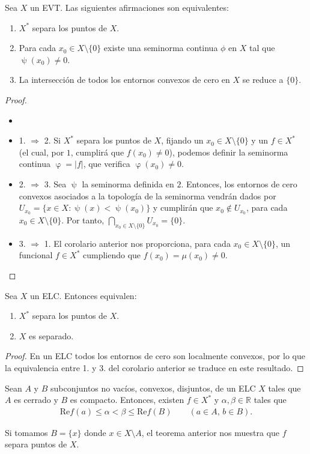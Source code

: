 \begin{corolario}
Sea $X$ un EVT. Las siguientes afirmaciones son equivalentes:
\begin{enumerate}
\item $X^{*}$ separa los puntos de $X$.
\item Para cada $x_{0}\in X\setminus \{0\}$ existe una seminorma continua $\phi$ en $X$ tal que $\uppsi(x_{0})\neq 0$.
\item La intersección de todos los entornos convexos de cero en $X$ se reduce a $\{0\}$.
\end{enumerate}
\end{corolario}
\begin{proof}
\begin{itemize}
\item[]
\item 1. $\Rightarrow$ 2. Si $X^{*}$ separa los puntos de $X$, fijando un $x_{0}\in X\setminus \{0\}$ y un $f\in X^{*}$ (el cual, por $1$, cumplirá que  $f(x_{0}) \neq 0$), podemos definir la seminorma continua $\upvarphi = |f|$, que verifica $\upvarphi (x_{0}) \neq 0$.


\item 2. $ \Rightarrow$ 3.  Sea $\uppsi$ la seminorma definida en $2$. Entonces, los entornos de cero convexos asociados a la topología de la seminorma vendrán dados por $U_{x_{0}} = \{x\in X : \uppsi(x) < \uppsi (x_{0}) \}$ y cumplirán que $x_{0}\notin U_{x_{0}}$, para cada $x_{0}\in X\setminus \{0\}$. Por tanto, $\bigcap_{x_{0}\in X\setminus \{0\}} U_{x_{0}} = \{0\}$.


\item 3. $ \Rightarrow$ 1. El corolario anterior nos proporciona, para cada $x_{0}\in X\setminus \{0\}$, un funcional $f\in X^{*}$ cumpliendo que $f(x_{0}) = \mu (x_{0}) \neq 0$. 
\end{itemize}
\end{proof}
\begin{corolario}
Sea $X$ un ELC. Entonces equivalen:
\begin{enumerate}
\item $X^{*}$ separa los puntos de $X$.
\item $X$ es separado. 
\end{enumerate}
\end{corolario}
\begin{proof}
En un ELC todos los entornos de cero son localmente convexos, por lo que la equivalencia entre 1. y 3. del corolario anterior se traduce en este resultado. 
\end{proof}
\begin{teorema}
Sean $A$ y $B$ subconjuntos no vacíos, convexos, disjuntos, de un ELC $X$ tales que $A$ es cerrado y $B$ es compacto. Entonces, existen $f\in X^{*}$ y $\alpha,\beta\in\mathds{R}$ tales que 
\begin{align*}
\text{Re}f(a) \leq \alpha < \beta \leq \text{Re} f(B) \qquad(a\in A \text{, }b\in B).
\end{align*}
\end{teorema}
\begin{observacion}Si tomamos $B = \{x\}$ donde $x\in X\setminus A$, el teorema anterior nos muestra que $f$ separa puntos de $X$. 
\end{observacion}

